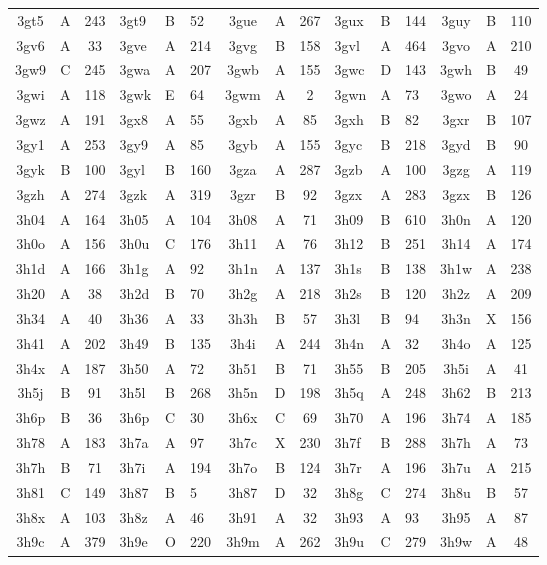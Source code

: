\begin{longtable}{|c|c|c| a|a|a| c|c|c| a|a|a| c|c|c|}
3gt5 & A & 243 & 3gt9 & B & 52 & 3gue & A & 267 & 3gux & B & 144 & 3guy & B & 110\\
3gv6 & A & 33 & 3gve & A & 214 & 3gvg & B & 158 & 3gvl & A & 464 & 3gvo & A & 210\\
3gw9 & C & 245 & 3gwa & A & 207 & 3gwb & A & 155 & 3gwc & D & 143 & 3gwh & B & 49\\
3gwi & A & 118 & 3gwk & E & 64 & 3gwm & A & 2 & 3gwn & A & 73 & 3gwo & A & 24\\
3gwz & A & 191 & 3gx8 & A & 55 & 3gxb & A & 85 & 3gxh & B & 82 & 3gxr & B & 107\\
3gy1 & A & 253 & 3gy9 & A & 85 & 3gyb & A & 155 & 3gyc & B & 218 & 3gyd & B & 90\\
3gyk & B & 100 & 3gyl & B & 160 & 3gza & A & 287 & 3gzb & A & 100 & 3gzg & A & 119\\
3gzh & A & 274 & 3gzk & A & 319 & 3gzr & B & 92 & 3gzx & A & 283 & 3gzx & B & 126\\
3h04 & A & 164 & 3h05 & A & 104 & 3h08 & A & 71 & 3h09 & B & 610 & 3h0n & A & 120\\
3h0o & A & 156 & 3h0u & C & 176 & 3h11 & A & 76 & 3h12 & B & 251 & 3h14 & A & 174\\
3h1d & A & 166 & 3h1g & A & 92 & 3h1n & A & 137 & 3h1s & B & 138 & 3h1w & A & 238\\
3h20 & A & 38 & 3h2d & B & 70 & 3h2g & A & 218 & 3h2s & B & 120 & 3h2z & A & 209\\
3h34 & A & 40 & 3h36 & A & 33 & 3h3h & B & 57 & 3h3l & B & 94 & 3h3n & X & 156\\
3h41 & A & 202 & 3h49 & B & 135 & 3h4i & A & 244 & 3h4n & A & 32 & 3h4o & A & 125\\
3h4x & A & 187 & 3h50 & A & 72 & 3h51 & B & 71 & 3h55 & B & 205 & 3h5i & A & 41\\
3h5j & B & 91 & 3h5l & B & 268 & 3h5n & D & 198 & 3h5q & A & 248 & 3h62 & B & 213\\
3h6p & B & 36 & 3h6p & C & 30 & 3h6x & C & 69 & 3h70 & A & 196 & 3h74 & A & 185\\
3h78 & A & 183 & 3h7a & A & 97 & 3h7c & X & 230 & 3h7f & B & 288 & 3h7h & A & 73\\
3h7h & B & 71 & 3h7i & A & 194 & 3h7o & B & 124 & 3h7r & A & 196 & 3h7u & A & 215\\
3h81 & C & 149 & 3h87 & B & 5 & 3h87 & D & 32 & 3h8g & C & 274 & 3h8u & B & 57\\
3h8x & A & 103 & 3h8z & A & 46 & 3h91 & A & 32 & 3h93 & A & 93 & 3h95 & A & 87\\
3h9c & A & 379 & 3h9e & O & 220 & 3h9m & A & 262 & 3h9u & C & 279 & 3h9w & A & 48\\

\end{longtable}

